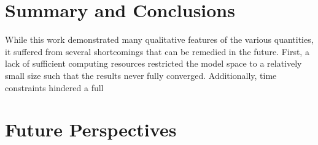 \documentclass[../thesis.tex]{subfiles}
\begin{document}
\section{Summary and Conclusions}

While this work demonstrated many qualitative features of the various quantities, it suffered from several shortcomings that can be remedied in the future.  First, a lack of sufficient computing resources restricted the model space to a relatively small size such that the results never fully converged.  Additionally, time constraints hindered a full 


\section{Future Perspectives}
\end{document}
